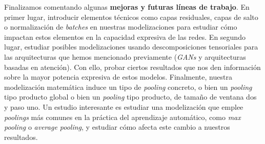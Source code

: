 Finalizamos comentando algunas \textbf{mejoras y futuras líneas de trabajo}. En primer lugar, introducir elementos técnicos como capas residuales, capas de salto o normalización de \textit{batches} en nuestras modelizaciones para estudiar cómo impactan estos elementos en la capacidad expresiva de las redes. En segundo lugar, estudiar posibles modelizaciones usando descomposiciones tensoriales para las arquitecturas que hemos mencionado previamente (\textit{GANs} y arquitecturas basadas en atención). Con ello, probar ciertos resultados que nos den información sobre la mayor potencia expresiva de estos modelos. Finalmente, nuestra modelización matemática induce un tipo de \textit{pooling} concreto, o bien un \textit{pooling} tipo producto global o bien un \textit{pooling} tipo producto, de tamaño de ventana dos y paso uno. Un estudio interesante es estudiar una modelización que emplee \textit{poolings} más comunes en la práctica del aprendizaje automático, como \textit{max pooling} o \textit{average pooling}, y estudiar cómo afecta este cambio a nuestros resultados.
